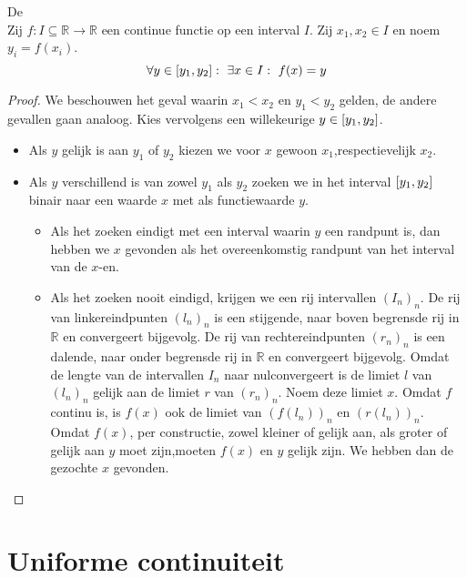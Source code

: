 \documentclass[main.tex]{subfiles}
\begin{document}
\begin{st}
  \label{st:tussenwaardestelling}
  De \\
  Zij $f: I \subseteq \mathbb{R} \rightarrow \mathbb{R}$ een continue functie op een interval $I$.
  Zij $x_{1},x_{2}\in I$ en noem $y_{i}=f(x_{i})$.
  \[ \forall y \in \interval{y_{1}}{y_{2}}:\ \exists x \in I:\ f(x) = y \]

  \begin{proof}
    We beschouwen het geval waarin $x_{1}<x_{2}$ en $y_{1}<y_{2}$ gelden, de andere gevallen gaan analoog.
    Kies vervolgens een willekeurige $y\in \interval{y_{1}}{y_{2}}$.
    \begin{itemize}
    \item Als $y$ gelijk is aan $y_{1}$ of $y_{2}$ kiezen we voor $x$ gewoon $x_{1}$,respectievelijk $x_{2}$.
    \item Als $y$ verschillend is van zowel $y_{1}$ als $y_{2}$ zoeken we in het interval $\interval{y_{1}}{y_{2}}$ binair naar een waarde $x$ met als functiewaarde $y$.
      \begin{itemize}
      \item Als het zoeken eindigt met een interval waarin $y$ een randpunt is, dan hebben we $x$ gevonden als het overeenkomstig randpunt van het interval van de $x$-en.
      \item Als het zoeken nooit eindigd, krijgen we een rij intervallen $(I_{n})_{n}$.
        De rij van linkereindpunten $(l_{n})_{n}$ is een stijgende, naar boven begrensde rij in $\mathbb{R}$ en convergeert bijgevolg.
        De rij van rechtereindpunten $(r_{n})_{n}$ is een dalende, naar onder begrensde rij in $\mathbb{R}$ en convergeert bijgevolg.
        Omdat de lengte van de intervallen $I_{n}$ naar nulconvergeert is de limiet $l$ van $(l_{n})_{n}$ gelijk aan de limiet $r$ van $(r_{n})_{n}$.
        Noem deze limiet $x$.
        Omdat $f$ continu is, is $f(x)$ ook de limiet van $(f(l_{n}))_{n}$ en $(r(l_{n}))_{n}$.
        Omdat $f(x)$, per constructie, zowel kleiner of gelijk aan, als groter of gelijk aan $y$ moet zijn,\waarom moeten $f(x)$ en $y$ gelijk zijn.
        We hebben dan de gezochte $x$ gevonden.
      \end{itemize}
    \end{itemize}
  \end{proof}
\end{st}

\section{Uniforme continuiteit}
\label{sec:unif-cont}
\end{document}
